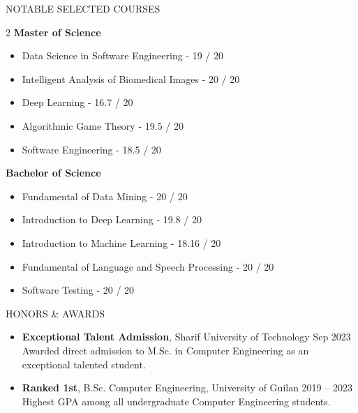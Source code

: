 \documentclass[]{CV}
\begin{document}
\vspace{-1mm}
\begin{section}{NOTABLE SELECTED COURSES}
\vspace{-2mm}
\begin{multicols}{2}
\textbf{Master of Science}
\begin{itemize}
    \item Data Science in Software Engineering - 19 / 20
    \item Intelligent Analysis of Biomedical Images - 20 / 20
    \item Deep Learning - 16.7 / 20
    \item Algorithmic Game Theory - 19.5 / 20
    \item Software Engineering - 18.5 / 20
    \vfill
\end{itemize}

\columnbreak

\textbf{Bachelor of Science}
\begin{itemize}
    \item Fundamental of Data Mining - 20 / 20
    \item Introduction to Deep Learning - 19.8 / 20
    \item Introduction to Machine Learning - 18.16 / 20
    \item Fundamental of Language and Speech Processing - 20 / 20
    \item Software Testing - 20 / 20
\end{itemize}
\end{multicols}
\end{section}

\vspace{-3mm}
\begin{section}{HONORS \& AWARDS}
\begin{itemize}
    \item \textbf{Exceptional Talent Admission}, Sharif University of Technology \hfill Sep 2023
    \newline Awarded direct admission to M.Sc. in Computer Engineering as an exceptional talented student.

    \item \textbf{Ranked 1st}, B.Sc. Computer Engineering, University of Guilan \hfill 2019 -- 2023
    \newline Highest GPA among all undergraduate Computer Engineering students.
\end{itemize}
\end{section}
\end{document}
